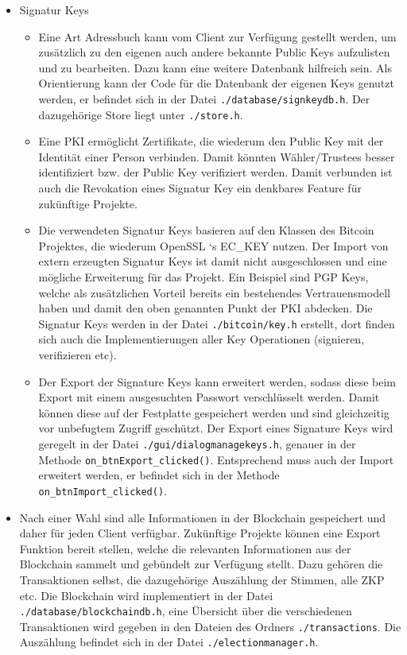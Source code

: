 \documentclass[colorback,accentcolor=tud1b]{tudreport}
\begin{document}
\begin{itemize}
\item Signatur Keys
\begin{itemize}
	\item Eine Art Adressbuch kann vom Client zur Verfügung gestellt werden, um zusätzlich zu den eigenen auch andere bekannte Public Keys aufzulisten und zu bearbeiten. Dazu kann eine weitere Datenbank hilfreich sein. Als Orientierung kann der Code für die Datenbank der eigenen Keys genutzt werden, er befindet sich in der Datei \texttt{./database/signkeydb.h}. Der dazugehörige Store liegt unter \texttt{./store.h}.
	\item Eine PKI ermöglicht Zertifikate, die wiederum den Public Key mit der Identität einer Person verbinden. Damit könnten Wähler/Trustees besser identifiziert bzw. der Public Key verifiziert werden. Damit verbunden ist auch die Revokation eines Signatur Key ein denkbares Feature für zukünftige Projekte.
	\item Die verwendeten Signatur Keys basieren auf den Klassen des Bitcoin Projektes, die wiederum OpenSSL `s EC\_KEY nutzen. Der Import von extern erzeugten Signatur Keys ist damit nicht ausgeschlossen und eine mögliche Erweiterung für das Projekt. Ein Beispiel sind PGP Keys, welche als zusätzlichen Vorteil bereits ein bestehendes Vertrauensmodell haben und damit den oben genannten Punkt der PKI abdecken. Die Signatur Keys werden in der Datei \texttt{./bitcoin/key.h} erstellt, dort finden sich auch die Implementierungen aller Key Operationen (signieren, verifizieren etc).
	\item Der Export der Signature Keys kann erweitert werden, sodass diese beim Export mit einem ausgesuchten Passwort verschlüsselt werden. Damit können diese auf der Festplatte gespeichert werden und sind gleichzeitig vor unbefugtem Zugriff geschützt. Der Export eines Signature Keys wird geregelt in der Datei \texttt{./gui/dialogmanagekeys.h}, genauer in der Methode \texttt{on\_btnExport\_clicked()}. Entsprechend muss auch der Import erweitert werden, er befindet sich in der Methode \texttt{on\_btnImport\_clicked()}.
\end{itemize}

\item Nach einer Wahl sind alle Informationen in der Blockchain gespeichert und daher für jeden Client verfügbar. Zukünftige Projekte können eine Export Funktion bereit stellen, welche die relevanten Informationen aus der Blockchain sammelt und gebündelt zur Verfügung stellt. Dazu gehören die Transaktionen selbst, die dazugehörige Auszählung der Stimmen, alle ZKP etc. Die Blockchain wird implementiert in der Datei \texttt{./database/blockchaindb.h}, eine Übersicht über die verschiedenen Transaktionen wird gegeben in den Dateien des Ordners \texttt{./transactions}. Die Auszählung befindet sich in der Datei \texttt{./electionmanager.h}.


\end{itemize}
\end{document}
